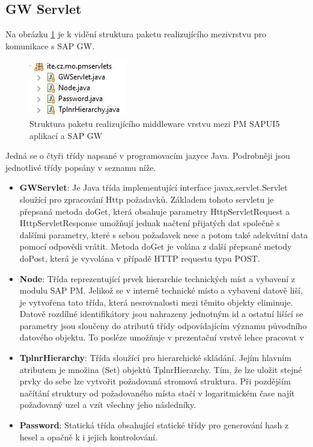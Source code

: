 \documentclass[thesis=M,czech]{FITthesis}[2012/06/26]
\begin{document}
\subsection{GW Servlet}
Na obrázku \ref{img:gw_servlet_structure} je k vidění struktura paketu realizujícího mezivrstvu pro komunikace s SAP GW. 
\begin{figure}[H]
	\centering
	\includegraphics[]{images/gw_servlet_structure}
	\caption{Struktura paketu realizujícího middleware vrstvu mezi PM SAPUI5 aplikací a SAP GW}
	\label{img:gw_servlet_structure}
\end{figure}
Jedná se o čtyři třídy napsané v programovacím jazyce Java. Podrobněji jsou jednotlivé třídy popsány v seznamu níže.

\begin{itemize}
	\item
	\textbf{GWServlet}: Je Java třída implementující interface javax.servlet.Servlet sloužící pro zpracování Http požadavků. Základem tohoto servletu je přepsaná metoda doGet, která obsahuje parametry HttpServletRequest a HttpServletResponse umožňují jednak načtení přijatých dat společně s dalšími parametry, které s sebou požadavek nese a potom také adekvátní data pomocí odpovědi vrátit. Metoda doGet je volána z další přepsané metody doPost, která je vyvolána v případě HTTP requestu typu POST. 
	\item
	\textbf{Node}: Třída reprezentující prvek hierarchie technických míst a vybavení z modulu SAP PM. Jelikož se v interně technické místo a vybavení datově liší, je vytvořena tato třída, která nesrovnalosti mezi těmito objekty eliminuje. Datově rozdílné identifikátory jsou nahrazeny jednotným id a ostatní lišící se parametry jsou sloučeny do atributů třídy odpovídajícím významu původního datového objektu. To posléze umožňuje v prezentační vrstvě lehce pracovat v 
	\item
	\textbf{TplnrHierarchy}: Třída sloužící pro hierarchické skládání. Jejím hlavním atributem je množina (Set) objektů TplnrHierarchy. Tím, že lze uložit stejné prvky do sebe lze vytvořit požadovaná stromová struktura. Při pozdějším načítání struktury od požadovaného místa stačí v logaritmickém čase najít požadovaný uzel a vzít všechny jeho následníky.
	\item
	\textbf{Password}: Statická třída obsahující statické třídy pro generování hash z hesel a opačně k i jejich kontrolování.
\end{itemize} 
\end{document}
